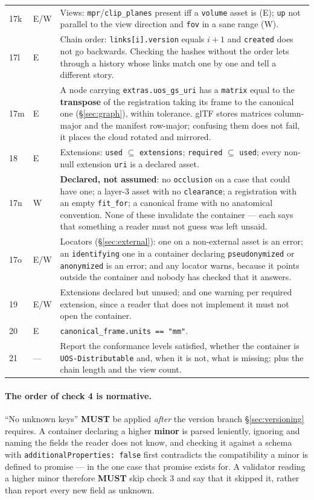 \documentclass[11pt,a4paper]{article}
\newcommand{\MUST}{\textcolor{uosred}{\textbf{MUST}}}
\newcommand{\code}[1]{\texttt{\small #1}}
\begin{document}
\begin{longtable}{C{0.8cm} C{0.9cm} L{13.4cm}}
17k & E/W & Views: \code{mpr}/\code{clip\_planes} present iff a \code{volume} asset is
(E); \code{up} not parallel to the view direction and \code{fov} in a sane range (W).\\
17l & E & Chain order: \code{links[i].version} equals $i+1$ and \code{created} does not go
backwards. Checking the hashes without the order lets through a history whose links match
one by one and tell a different story.\\
17m & E & A node carrying \code{extras.uos\_gs\_uri} has a \code{matrix} equal to the
\textbf{transpose} of the registration taking its frame to the canonical one
(\S\ref{sec:graph}), within tolerance. glTF stores matrices column-major and the manifest
row-major; confusing them does not fail, it places the cloud rotated and mirrored.\\18 & E & Extensions: \code{used} $\subseteq$ \code{extensions}; \code{required} $\subseteq$
\code{used}; every non-null extension \code{uri} is a declared asset.\\
17n & W & \textbf{Declared, not assumed}: no \code{occlusion} on a case that could
have one; a layer-3 asset with no \code{clearance}; a registration with an empty
\code{fit\_for}; a canonical frame with no anatomical convention. None of these invalidate
the container --- each says that something a reader must not guess was left unsaid.\\
17o & E/W & Locators (\S\ref{sec:external}): one on a non-external asset is an
error; an \code{identifying} one in a container declaring \code{pseudonymized} or
\code{anonymized} is an error; and any locator warns, because it points outside the
container and nobody has checked that it answers.\\
19 & E/W & Extensions declared but unused; and one warning per required extension, since a
reader that does not implement it must not open the container.\\
20 & E & \code{canonical\_frame.units == "mm"}.\\
21 & --- & Report the conformance levels satisfied, whether the container is
\code{UOS-Distributable} and, when it is not, what is missing; plus the chain length and
the view count.\\
\bottomrule
\end{longtable}

\paragraph{The order of check 4 is normative.}
``No unknown keys'' \MUST{} be applied \emph{after} the version branch \S\ref{sec:versioning}
requires. A container declaring a higher \textbf{minor} is parsed leniently, ignoring and
naming the fields the reader does not know, and checking it against a schema with
\code{additionalProperties: false} first contradicts the compatibility a minor is defined
to promise --- in the one case that promise exists for. A validator reading a higher minor
therefore \MUST{} skip check 3 and say that it skipped it, rather than report every new
field as unknown.
\end{document}
